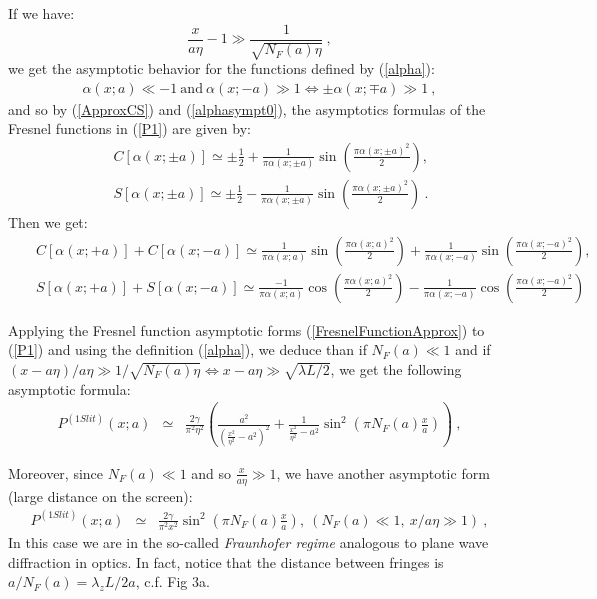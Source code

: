 \documentclass[12pt,aps,prb,preprint]{revtex4-1}   %
\begin{document}
{
If we have: $$\frac{x}{a\eta}-1\gg \frac{1}{\sqrt{N_F(a)\eta}}\ ,$$ 
we get the asymptotic behavior for the functions defined by (\ref{alpha}):
\begin{eqnarray}\label{alphasympt0}
\alpha(x;a)\ll-1\ \mathrm{and}\ \alpha(x;-a)\gg1 \Leftrightarrow \pm\alpha(x;\mp a)\gg1\ ,
\end{eqnarray}
and so by (\ref{ApproxCS}) and (\ref{alphasympt0}),
the asymptotics formulas of the Fresnel functions in (\ref{P1}) are given by:
\begin{eqnarray}\label{CSasympt1}
&& C[\alpha(x;\pm a)]\simeq \pm\frac{1}{2} + \frac{1}{\pi\alpha(x;\pm a)}\sin{(\frac{\pi\alpha(x;\pm a)^2}{2})},
{}\nonumber\\{}&& S[\alpha(x;\pm a)]\simeq \pm\frac{1}{2} - \frac{1}{\pi\alpha(x;\pm a)}\sin{(\frac{\pi\alpha(x;\pm a)^2}{2})}\ .
\end{eqnarray}}
{Then we get:
\begin{eqnarray}\label{FresnelFunctionApprox}
&& C[\alpha(x;+a)]+C[\alpha(x;-a)]\simeq \frac{1}{\pi\alpha(x;a)}\sin{(\frac{\pi\alpha(x;a)^2}{2})}
+\frac{1}{\pi\alpha(x;-a)}\sin{(\frac{\pi\alpha(x;-a)^2}{2})},
{}\nonumber\\{}&& S[\alpha(x;+a)]+S[\alpha(x;-a)]\simeq \frac{-1}{\pi\alpha(x;a)}\cos{(\frac{\pi\alpha(x;a)^2}{2})}
-\frac{1}{\pi\alpha(x;-a)}\cos{(\frac{\pi\alpha(x;-a)^2}{2})}
\end{eqnarray}}


Applying the Fresnel function asymptotic forms (\ref{FresnelFunctionApprox}) to
(\ref{P1}) and using the definition (\ref{alpha}), we deduce than if $N_F(a)\ll 1$ and
if $(x-a\eta)/a\eta\gg 1/\sqrt{N_F(a)\eta}\Leftrightarrow
x-a\eta\gg\sqrt{\lambda L/2}$, we get the following asymptotic
formula:
\begin{eqnarray}\label{P1ApproxNFsmall0}
P^{(1 Slit)}(x;a)&\simeq&\frac{2\gamma}{\pi^2\eta^2}
\left(\frac{a^2}{(\frac{x^2}{\eta^2}-a^2)^2} +
\frac{1}{\frac{x^2}{\eta^2}-a^2}\sin^2{(\pi N_F(a)
\frac{x}{a})}\right) \ ,
\end{eqnarray}


Moreover, since $N_F(a)\ll1$ and so $\frac{x}{a\eta}\gg1$, we have another asymptotic form
(large distance on the screen):
\begin{eqnarray}\label{P1ApproxNFsmall}
P^{(1 Slit)}(x;a)&\simeq&\frac{2\gamma}{\pi^2 x^2} \sin^2{(\pi
N_F(a) \frac{x}{a})},\ (N_F(a)\ll1,\ x/a\eta\gg 1)\ ,
\end{eqnarray}
In this case we are in the so-called \textit{Fraunhofer regime}
analogous to plane wave diffraction in optics.\cite{Optics} In
fact, notice that the distance between fringes is
$a/N_F(a)=\lambda_z L/2a$, c.f. Fig 3a.
\end{document}
